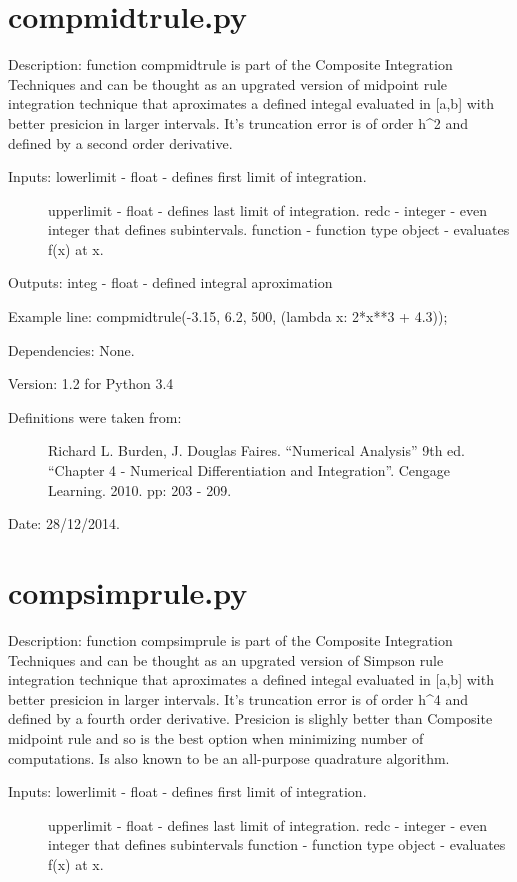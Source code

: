 \documentclass[letterpaper,10pt,oneside]{sphinxmanual}
\theoremstyle{plain}%
\theoremstyle{definition}%
\theoremstyle{remark}%
\begin{document}
\section{compmidtrule.py}
\label{code:module-compmidtrule}\label{code:compmidtrule-py}
Description: function compmidtrule is part of the Composite Integration
Techniques and can be thought as an upgrated version of midpoint rule
integration technique that aproximates a defined integal evaluated in {[}a,b{]}
with better presicion in larger intervals. It's truncation error is of order
h\textasciicircum{}2 and defined by a second order derivative.
\begin{description}
\item[{Inputs: lowerlimit - float - defines first limit of integration.}] \leavevmode
upperlimit - float - defines last limit of integration.
redc - integer - even integer that defines subintervals.
function - function type object - evaluates f(x) at x.

\end{description}

Outputs: integ - float - defined integral aproximation

Example line: compmidtrule(-3.15, 6.2, 500, (lambda x: 2*x**3 + 4.3));

Dependencies: None.

Version: 1.2 for Python 3.4
\begin{description}
\item[{Definitions were taken from:}] \leavevmode
Richard L. Burden, J. Douglas Faires. ``Numerical Analysis'' 9th ed.
``Chapter 4 - Numerical Differentiation and Integration''. 
Cengage Learning. 2010. pp: 203 - 209.

\end{description}




Date: 28/12/2014.


\section{compsimprule.py}
\label{code:compsimprule-py}\label{code:module-compsimprule}
Description: function compsimprule is part of the Composite Integration
Techniques and can be thought as an upgrated version of Simpson rule
integration technique that aproximates a defined integal evaluated in {[}a,b{]}
with better presicion in larger intervals. It's truncation error is of order
h\textasciicircum{}4 and defined by a fourth order derivative. Presicion is slighly better
than Composite midpoint rule and so is the best option when minimizing
number of computations. Is also known to be an all-purpose quadrature algorithm.
\begin{description}
\item[{Inputs: lowerlimit - float - defines first limit of integration.}] \leavevmode
upperlimit - float - defines last limit of integration.
redc - integer - even integer that defines subintervals
function - function type object - evaluates f(x) at x.

\end{description}
\end{document}
